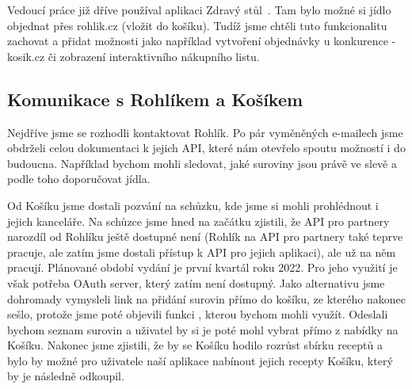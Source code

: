 Vedoucí práce již dříve používal aplikaci Zdravý stůl~\cite{ZdravyStul}. Tam bylo možné si jídlo objednat přes rohlik.cz (vložit do košíku).
Tudíž jsme chtěli tuto funkcionalitu zachovat a přidat možnosti jako například vytvoření objednávky u konkurence - kosik.cz
či zobrazení interaktivního nákupního listu.

\subsection{Komunikace s Rohlíkem a Košíkem}
Nejdříve jsme se rozhodli kontaktovat Rohlík. Po pár vyměněných e-mailech jsme obdrželi celou dokumentaci k jejich API,
které nám otevřelo spoutu možností i do budoucna. Například bychom mohli sledovat, jaké suroviny jsou právě ve slevě a
podle toho doporučovat jídla.

Od Košíku jsme dostali pozvání na schůzku, kde jsme si mohli prohlédnout i jejich kanceláře. Na schůzce jsme hned na začátku
zjistili, že API pro partnery narozdíl od Rohlíku ještě dostupné není (Rohlík na API pro partnery také teprve pracuje,
ale zatím jsme dostali přístup k API pro jejich aplikaci), ale už na něm pracují. Plánované období vydání je
první kvartál roku 2022. Pro jeho využití je však potřeba OAuth server, který zatím není dostupný. %
Jako alternativu jsme dohromady vymysleli link na přidání surovin přímo do košíku, ze kterého nakonec sešlo, protože jsme
poté objevili funkci , kterou bychom mohli využít. Odeslali bychom seznam surovin a uživatel by si je poté
mohl vybrat přímo z nabídky na Košíku. Nakonec jsme zjistili, že by se Košíku hodilo rozrůst sbírku receptů a bylo by možné
pro uživatele naší aplikace nabínout jejich recepty Košíku, který by je následně odkoupil.

